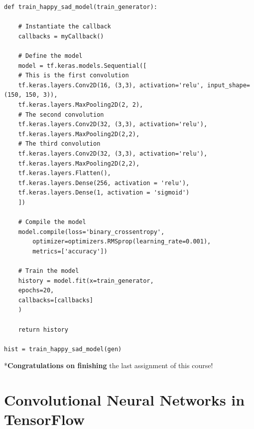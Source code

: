 \documentclass[20pt]{article}
\begin{document}
\begin{itemize}
\begin{verbatim}
def train_happy_sad_model(train_generator):

	# Instantiate the callback
	callbacks = myCallback()
	
	# Define the model
	model = tf.keras.models.Sequential([
	# This is the first convolution
	tf.keras.layers.Conv2D(16, (3,3), activation='relu', input_shape=(150, 150, 3)),
	tf.keras.layers.MaxPooling2D(2, 2),
	# The second convolution
	tf.keras.layers.Conv2D(32, (3,3), activation='relu'),
	tf.keras.layers.MaxPooling2D(2,2),
	# The third convolution
	tf.keras.layers.Conv2D(32, (3,3), activation='relu'),
	tf.keras.layers.MaxPooling2D(2,2),
	tf.keras.layers.Flatten(),
	tf.keras.layers.Dense(256, activation = 'relu'),
	tf.keras.layers.Dense(1, activation = 'sigmoid')
	])
	
	# Compile the model
	model.compile(loss='binary_crossentropy',
		optimizer=optimizers.RMSprop(learning_rate=0.001),
		metrics=['accuracy'])     
		
	# Train the model
	history = model.fit(x=train_generator,
	epochs=20,
	callbacks=[callbacks]
	)
	
	return history
	
hist = train_happy_sad_model(gen)
	\end{verbatim}
	*\textbf{Congratulations on finishing} the last assignment of this course!
	\end{itemize}
	
	\section{Convolutional Neural Networks in TensorFlow}
\end{document}
